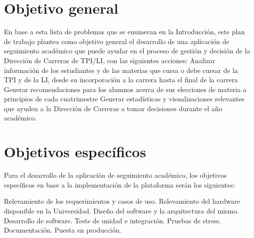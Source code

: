 \section[Objetivo general]{Objetivo general}
En base a esta lista de problemas que se enumeran en la Introducción, este plan de trabajo plantea como objetivo general el desarrollo de una aplicación de seguimiento académico que puede ayudar en el proceso de gestión y decisión de la Dirección de Carreras de TPI/LI, con las siguientes acciones:
Analizar información de los estudiantes y de las materias que cursa o debe cursar de la TPI y de la LI, desde su incorporación a la carrera hasta el final de la carrera    
Generar recomendaciones para los alumnos acerca de sus elecciones de materia a principios de cada cuatrimestre
Generar estadísticas y visualizaciones relevantes que ayuden a la Dirección de Carreras a tomar decisiones durante el año académico.

\section[Objetivos específicos]{Objetivos específicos}
Para el desarrollo de la aplicación de seguimiento académico, los objetivos específicos en base a la implementación de la plataforma serán los siguientes:

\begin{outline}
    \1 Relevamiento de los requerimientos y casos de uso.
    \1 Relevamiento del hardware disponible en la Universidad.
    \1 Diseño del software y la arquitectura del mismo.
    \1 Desarrollo de software.
    \1 Tests de unidad e integración.
    \1 Pruebas de stress.
    \1 Documentación.
    \1 Puesta en producción.
\end{outline}
